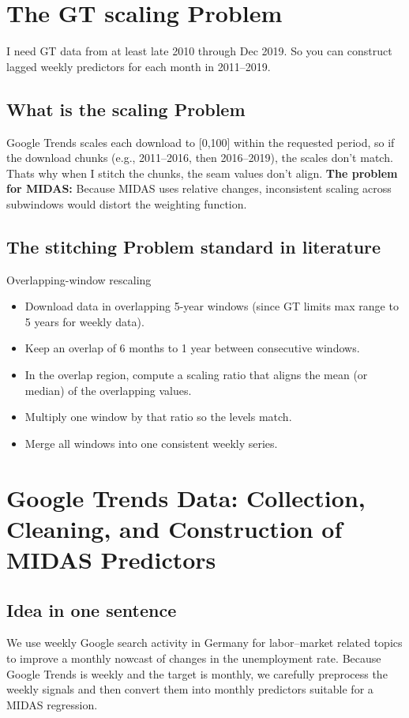 \documentclass{article}
\begin{document}
\section{The GT scaling Problem}
I need GT data from at least late 2010 through Dec 2019. So you can construct lagged weekly predictors for each month in 2011–2019.
\subsection{What is the scaling Problem}
Google Trends scales each download to [0,100] within the requested period, so if the download chunks (e.g., 2011–2016, then 2016–2019), the scales don’t match.
Thats why when I stitch the chunks, the seam values don’t align. 
\textbf{The problem for MIDAS:} Because MIDAS uses relative changes, inconsistent scaling across subwindows would distort the weighting function.

\subsection{The stitching Problem standard in literature}
Overlapping-window rescaling
\begin{itemize}
    \item Download data in overlapping 5-year windows (since GT limits max range to 5 years for weekly data).
    \item Keep an overlap of 6 months to 1 year between consecutive windows.
    \item In the overlap region, compute a scaling ratio that aligns the mean (or median) of the overlapping values.
    \item Multiply one window by that ratio so the levels match.
    \item Merge all windows into one consistent weekly series.
\end{itemize}

\section{Google Trends Data: Collection, Cleaning, and Construction of MIDAS Predictors}

\subsection{Idea in one sentence}
We use weekly Google search activity in Germany for labor–market related topics to improve a monthly nowcast of changes in the unemployment rate. Because Google Trends is weekly and the target is monthly, we carefully preprocess the weekly signals and then convert them into monthly predictors suitable for a MIDAS regression.
\end{document}

